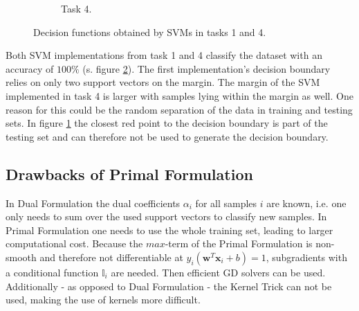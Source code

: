 \documentclass{article}
\begin{document}
\begin{figure}[!ht]
\begin{subfigure}{0.7\textwidth}
\caption{Task 4.}
\label{4_4}
\end{subfigure}
\caption{Decision functions obtained by SVMs in tasks 1 and 4.}
\label{4_comp}
\end{figure}

Both SVM implementations from task 1 and 4 classify the dataset with an accuracy of $100\%$ (s. figure \ref{4_comp}). The first implementation's decision boundary relies on only two support vectors on the margin. The margin of the SVM implemented in task 4 is larger with samples lying within the margin as well. One reason for this could be the random separation of the data in training and testing sets. In figure \ref{4_4} the closest red point to the decision boundary is part of the testing set and can therefore not be used to generate the decision boundary.

\subsection{Drawbacks of Primal Formulation}

In Dual Formulation the dual coefficients $\alpha_i$ for all samples $i$ are known, i.e. one only needs to sum over the used support vectors to classify new samples. In Primal Formulation one needs to use the whole training set, leading to larger computational cost. Because the $max$-term of the Primal Formulation is non-smooth and therefore not differentiable at $y_i(\mathbf{w}^T\mathbf{x}_i+b) = 1$, subgradients with a conditional function $\mathbb{I}_i$ are needed. Then efficient GD solvers can be used.\\
Additionally - as opposed to Dual Formulation - the Kernel Trick can not be used, making the use of kernels more difficult.
\end{document}
